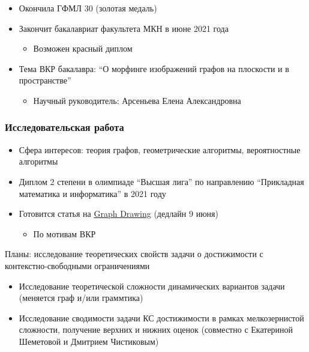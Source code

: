 \documentclass[xcolor=table,aspectratio=169]{beamer}
\begin{document}
\begin{frame}[fragile]
\begin{minipage}[m]{0.54\linewidth}
\begin{itemize}
        \item Окончила ГФМЛ 30 (золотая медаль)
        \item Закончит бакалавриат факультета МКН в июне 2021 года        
        \begin{itemize}
          \item Возможен красный диплом
        \end{itemize}
        \item Тема ВКР бакалавра: ``О морфинге изображений графов на плоскости и в пространстве''
        \begin{itemize}
          \item Научный руководитель: Арсеньева Елена Александровна
        \end{itemize}        
  
  \end{itemize}
  \end{minipage}

\end{frame}


\begin{frame}[fragile] \frametitle{Исследовательская работа}
  
    \begin{itemize}
        \item Сфера интересов: теория графов, геометрические алгоритмы, вероятностные алгоритмы
        \item Диплом 2 степени в олимпиаде ``Высшая лига'' по направлению ``Прикладная математика и информатика'' в 2021 году        
        \item Готовится статья на \href{https://algo.inf.uni-tuebingen.de/gd2021/}{Graph Drawing} (дедлайн 9 июня)
            \begin{itemize}
              \item По мотивам ВКР              
            \end{itemize}      
    \end{itemize}
  \pause
  \vfill
  Планы: исследование теоретических свойств задачи о достижимости с контекстно-свободными ограничениями
  \begin{itemize}
        \item Исследование теоретической сложности динамических вариантов задачи (меняется граф и/или граммтика)
        \item Исследование сводимости задачи КС достижимости в рамках мелкозернистой сложности, получение верхних и нижних оценок (совместно с Екатериной Шеметовой и Дмитрием Чистиковым)
  \end{itemize}

\end{frame}
\end{document}
